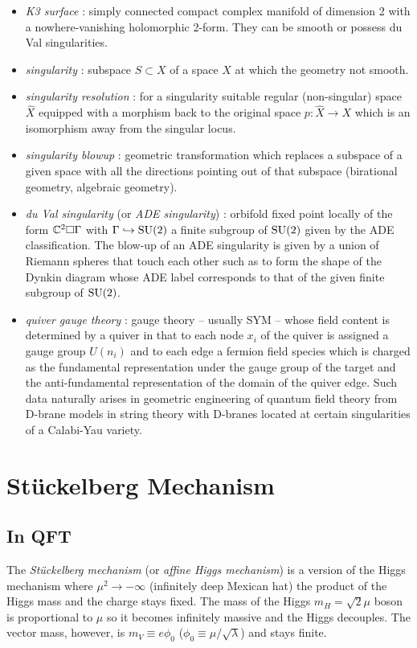 \documentclass[a4paper,8pt]{article}
\begin{document}
\begin{itemize}
        \item \emph{K3 surface} : simply connected compact complex manifold of dimension 2 with a nowhere-vanishing holomorphic 2-form. They can be smooth or possess du Val singularities.
        \item \emph{singularity} : subspace $S\subset X$ of a space $X$ at which the geometry not smooth.
        \item \emph{singularity resolution} : for a singularity  suitable regular (non-singular) space $\hat{X}$ equipped with a morphism back to the original space $p:\hat{X}\to X$ which is an isomorphism away from the singular locus.
        \item \emph{singularity blowup} : geometric transformation which replaces a subspace of a given space with all the directions pointing out of that subspace (birational geometry, algebraic geometry).
        \item \emph{du Val singularity} (or \emph{ADE singularity}) : orbifold fixed point locally of the form $\mathbb{C}^2\square\Gamma$ with $\Gamma\hookrightarrow\text{SU}(2)$ a finite subgroup of $\text{SU}(2)$ given by the ADE classification. The blow-up of an ADE singularity is given by a union of Riemann spheres that touch each other such as to form the shape of the Dynkin diagram whose ADE label corresponds to that of the given finite subgroup of $\text{SU}(2)$.
        \item \emph{quiver gauge theory} : gauge theory -- usually SYM -- whose field content is determined by a quiver in that to each node $x_i$ of the quiver is assigned a gauge group $U(n_i)$ and to each edge a fermion field species which is charged as the fundamental representation under the gauge group of the target and the anti-fundamental representation of the domain of the quiver edge. Such data naturally arises in geometric engineering of quantum field theory from D-brane models in string theory with D-branes located at certain singularities of a Calabi-Yau variety.
    \end{itemize}

\section{Stückelberg Mechanism}

    \subsection{In QFT}

        The \emph{Stückelberg mechanism} (or \emph{affine Higgs mechanism}) is a version of the Higgs mechanism where $\mu^2\to-\infty$ (infinitely deep Mexican hat) the product of the Higgs mass and the charge stays fixed. The mass of the Higgs $m_H=\sqrt{2}\mu$ boson is proportional to $\mu$ so it becomes infinitely massive and the Higgs decouples. The vector mass, however, is $m_V\equiv e\phi_0$ ($\phi_0\equiv\mu/\sqrt{\lambda}$) and stays finite.
\end{document}
